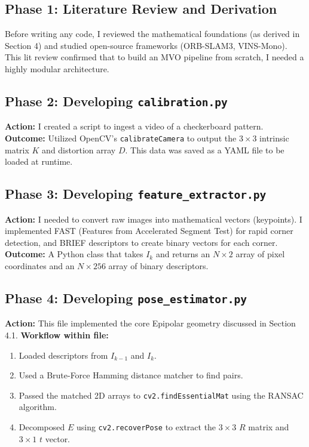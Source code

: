 \documentclass[12pt]{article}
\begin{document}
\subsection{Phase 1: Literature Review and Derivation}
Before writing any code, I reviewed the mathematical foundations (as derived in Section 4) and studied open-source frameworks (ORB-SLAM3, VINS-Mono). This lit review confirmed that to build an MVO pipeline from scratch, I needed a highly modular architecture.

\subsection{Phase 2: Developing \texttt{calibration.py}}
\textbf{Action:} I created a script to ingest a video of a checkerboard pattern.
\textbf{Outcome:} Utilized OpenCV's \texttt{calibrateCamera} to output the $3 \times 3$ intrinsic matrix $K$ and distortion array $D$. This data was saved as a YAML file to be loaded at runtime.

\subsection{Phase 3: Developing \texttt{feature\_extractor.py}}
\textbf{Action:} I needed to convert raw images into mathematical vectors (keypoints). I implemented FAST (Features from Accelerated Segment Test) for rapid corner detection, and BRIEF descriptors to create binary vectors for each corner.
\textbf{Outcome:} A Python class that takes $I_k$ and returns an $N \times 2$ array of pixel coordinates and an $N \times 256$ array of binary descriptors.

\subsection{Phase 4: Developing \texttt{pose\_estimator.py}}
\textbf{Action:} This file implemented the core Epipolar geometry discussed in Section 4.1. 
\textbf{Workflow within file:}
\begin{enumerate}
    \item Loaded descriptors from $I_{k-1}$ and $I_k$.
    \item Used a Brute-Force Hamming distance matcher to find pairs.
    \item Passed the matched 2D arrays to \texttt{cv2.findEssentialMat} using the RANSAC algorithm.
    \item Decomposed $E$ using \texttt{cv2.recoverPose} to extract the $3 \times 3$ $R$ matrix and $3 \times 1$ $t$ vector.
\end{enumerate}
\end{document}
